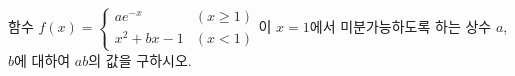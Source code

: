 함수 $f(x)=\begin{cases} ae^{-x} & (x\ge 1) \\ x^2+bx-1 & (x<1) \end{cases}$이 $x=1$에서 미분가능하도록 하는 상수 $a$, $b$에 대하여 $ab$의 값을 구하시오.
